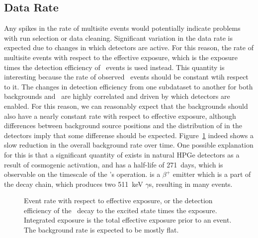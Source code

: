 \documentclass[/main.tex]{subfiles}
\begin{document}
\subsection{Data Rate}
Any spikes in the rate of multisite events would potentially indicate problems with run selection or data cleaning.
Significant variation in the data rate is expected due to changes in which detectors are active.
For this reason, the rate of multisite events with respect to the effective exposure, which is the exposure times the detection efficiency of \bbes\ events is used instead.
This quantity is interesting because the rate of observed \bbes\ events should be constant wtih respect to it.
The changes in detection efficiency from one subdataset to another for both backgrounds and \bbes\ are highly correlated and driven by which detectors are enabled.
For this reason, we can reasonably expect that the backgrounds should also have a nearly constant rate with respect to effective exposure, although differences between background source positions and the distribution of  in the detectors imply that some differense should be expected.
Figure~\ref{fig:eventrate} indeed shows a slow reduction in the overall background rate over time.
One possible explanation for this is that a significant quantity of  exists in natural HPGe detectors as a result of cosmogenic activation, and has a half-life of 271~days, which is observable on the timescale of the \MJD's operation.
 is a $\beta^+$ emitter which is a part of the  decay chain, which produces two 511~keV $\gamma$s, resulting in many \msmd events.
\begin{figure}[ht]
  \centering
  \caption[Event rate in both modules with respect to effective exposure]{\label{fig:eventrate}
    Event rate with respect to effective exposure, or the detection efficiency of the \tnbb\ decay to the  excited state times the exposure. Integrated exposure is the total effective exposure prior to an event. The background rate is expected to be mostly flat.
  }
\end{figure}
\end{document}
